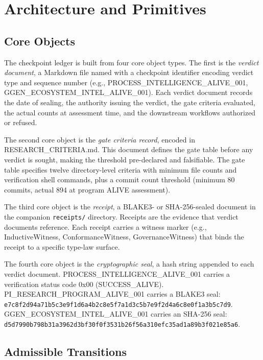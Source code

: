 \section{Architecture and Primitives}
\label{sec:checkpoints-architecture}

\subsection{Core Objects}
\label{sec:checkpoints-architecture-core-objects}

The checkpoint ledger is built from four core object types. The first is the \emph{verdict document},
a Markdown file named with a checkpoint identifier encoding verdict type and sequence number
(e.g., PROCESS\_INTELLIGENCE\_ALIVE\_001, GGEN\_ECOSYSTEM\_INTEL\_ALIVE\_001). Each verdict
document records the date of sealing, the authority issuing the verdict, the gate criteria evaluated,
the actual counts at assessment time, and the downstream workflows authorized or refused.

The second core object is the \emph{gate criteria record}, encoded in RESEARCH\_CRITERIA.md. This
document defines the gate table before any verdict is sought, making the threshold pre-declared and
falsifiable. The gate table specifies twelve directory-level criteria with minimum file counts and
verification shell commands, plus a commit count threshold (minimum 80 commits, actual 894 at
program ALIVE assessment).

The third core object is the \emph{receipt}, a BLAKE3- or SHA-256-sealed document in the companion
\texttt{receipts/} directory. Receipts are the evidence that verdict documents reference. Each
receipt carries a witness marker (e.g., InductiveWitness, ConformanceWitness, GovernanceWitness)
that binds the receipt to a specific type-law surface.

The fourth core object is the \emph{cryptographic seal}, a hash string appended to each verdict
document. PROCESS\_INTELLIGENCE\_ALIVE\_001 carries a verification status code 0x00 (SUCCESS\_ALIVE).
PI\_RESEARCH\_PROGRAM\_ALIVE\_001 carries a BLAKE3 seal:
\texttt{e7c8f2d94a71b5c3e9f1d6a4b2c8e5f7a1d3c5b7e9f2d4a6c8e0f1a3b5c7d9}.
GGEN\_ECOSYSTEM\_INTEL\_ALIVE\_001 carries an SHA-256 seal:
\texttt{d5d7990b798b31a3962d3bf30f0f3531b26f56a310efc35ad1a89b3f021e85a6}.

\subsection{Admissible Transitions}
\label{sec:checkpoints-architecture-transitions}

